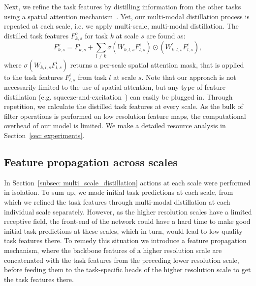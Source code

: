 \documentclass[runningheads]{llncs}
\begin{document}
Next, we refine the task features by distilling information from the other tasks using a spatial attention mechanism~\cite{xu2018pad}. Yet, our multi-modal distillation process is repeated at each scale, i.e. we apply multi-scale, multi-modal distillation. The distilled task features $F_{k, s}^{o}$ for task $k$ at scale $s$ are found as:
\begin{equation}
    F_{k,s}^{o} = F_{k,s}^{i} + \sum_{l \neq k} \sigma \left( W_{k,l,s} F_{l,s}^{i} \right) \odot \left( W_{k,l,s}^{'} F_{l,s}^{i} \right),
\end{equation}
where $\sigma \left( W_{k,l,s} F^{i}_{l,s} \right)$ returns a per-scale spatial attention mask, that is applied to the task features $F_{l,s}^{i}$ from task $l$ at scale $s$. Note that our approach is not necessarily limited to the use of spatial attention, but any type of feature distillation (e.g. squeeze-and-excitation~\cite{hu2018squeeze}) can easily be plugged in. Through repetition, we calculate the distilled task features at every scale. As the bulk of filter operations is performed on low resolution feature maps, the computational overhead of our model is limited. We make a detailed resource analysis in Section~\ref{sec: experiments}.

\subsection{Feature propagation across scales}
\label{subsec: feature_propagation}
In Section~\ref{subsec: multi_scale_distillation} actions at each scale were performed in isolation. To sum up, we made initial task predictions at each scale, from which we refined the task features through multi-modal distillation at each individual scale separately. However, as the higher resolution scales have a limited receptive field, the front-end of the network could have a hard time to make good initial task predictions at these scales, which in turn, would lead to low quality task features there. To remedy this situation we introduce a feature propagation mechanism, where the backbone features of a higher resolution scale are concatenated with the task features from the preceding lower resolution scale, before feeding them to the task-specific heads of the higher resolution scale to get the task features there.
\end{document}
